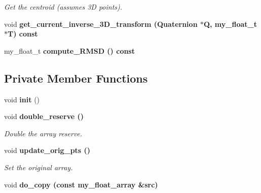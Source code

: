 \begin{CompactItemize}
\begin{CompactList}\small\item\em Get the centroid (assumes 3D points). \item\end{CompactList}\item 
void \bf{get\_\-current\_\-inverse\_\-3D\_\-transform} (Quaternion $\ast$Q, my\_\-float\_\-t $\ast$T) const 
\item 
my\_\-float\_\-t \bf{compute\_\-RMSD} () const 
\end{CompactItemize}
\subsection*{Private Member Functions}
\begin{CompactItemize}
\item 
void \textbf{init} ()\label{classSimSite3D_1_1my__float__array_cd4c500b6129b80a28b9aaf3c9253d2f}

\item 
void \bf{double\_\-reserve} ()\label{classSimSite3D_1_1my__float__array_70345204169e7017a18fb1c0de64336d}

\begin{CompactList}\small\item\em Double the array reserve. \item\end{CompactList}\item 
void \bf{update\_\-orig\_\-pts} ()\label{classSimSite3D_1_1my__float__array_2a888e41827034da0597d88b1e3470e7}

\begin{CompactList}\small\item\em Set the original array. \item\end{CompactList}\item 
void \bf{do\_\-copy} (const \bf{my\_\-float\_\-array} \&src)
\end{CompactItemize}
